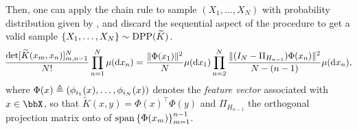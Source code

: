 \documentclass[twoside,11pt]{article}
\begin{document}
        Then, one can apply the chain rule to sample $(X_1,\dots,X_N)$ with probability distribution given by , and discard the sequential aspect of the procedure to get a valid sample $\left\{ X_{1}, \dots, X_{N} \right\} \sim \operatorname{DPP}(\widetilde{K})$.
        \begin{equation}
        \label{eq:joint_distribution}\\
        \!
        \frac{\det[\widetilde K(x_m,x_n)]_{m,n=1}^N}{N!}
            \prod_{n=1}^N \mu(\mathop{}\!\mathrm{d} x_n)
        =
                \frac{\|\Phi(x_1)\|^2}{N}
            \mu(\mathop{}\!\mathrm{d} x_1)
            \prod_{n=2}^{N}
                \frac{\| (I_N-\Pi_{H_{n-1}}) \Phi(x_n)\|^2}{N-(n-1)}
                \mu(\mathop{}\!\mathrm{d} x_n),
        \!
        \end{equation}
        where
        $\Phi(x) \triangleq \left( \phi_{i_1}(x),\dots,\phi_{i_N}(x) \right)$
        denotes the \emph{feature vector} associated with $x\in\bbX$,
        so that
        $\tilde{K}(x,y) = \Phi(x)^{\top} \Phi(y)$
        and
        $\Pi_{H_{n-1}}$ the orthogonal projection matrix onto of
        $\operatorname{span}\left\{ \Phi(x_m) \right\}_{m=1}^{n-1}$.
\end{document}
